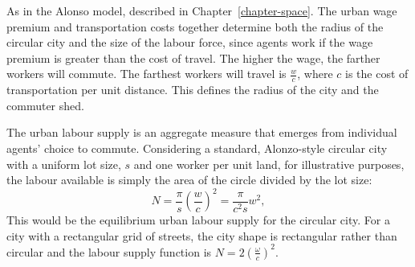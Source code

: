 

As in the Alonso model, described in Chapter~\ref{chapter-space}. The {urban wage premium} and transportation costs together determine both the radius of the circular city and the size of the labour force, %
since agents work if the wage premium is greater than the cost of travel. %
The higher the wage, the  farther workers will commute. %
The farthest workers will travel  is $\frac{w}{{c}}$, where ${c}$ is the cost of transportation per unit distance. This defines the radius of the city and the commuter shed.

The \gls{urban labour supply} is an \gls{aggregate} measure that emerges from individual agents' choice to commute. Considering a standard, Alonzo-style \gls{circular city} with a uniform lot size, $s$ and  one worker per unit land, for illustrative purposes, the labour available is simply the area of the circle divided by the lot size: 
\begin{equation}
 N = \frac{\pi}{s} \left(\frac{w}{{c}}\right)^2
   =\frac{\pi}{{c}^2 s} w^2,
\label{eqn-labour-supply1}
\end{equation}
This would be the equilibrium \gls{urban labour supply}  for the circular city. For a city with a rectangular grid of streets, the city shape is rectangular rather than circular and the labour supply function is $N= 2\left(\frac{\omega}{c}\right)^2$. %


